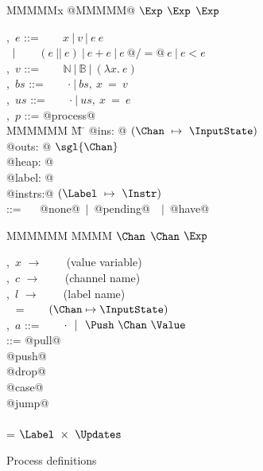 
\begin{figure}
\begin{minipage}[t]{0.4\textwidth}
\begin{tabbing}
MMMMMx \TABDEF @MMMMM@  \TABSKIP $\Exp$ \TABSKIP $\Exp$ \TABSKIP $\Exp$ \kill

\Exp,~$e$       \> ::= \> ~~~ $x~|~v~|~e~e $ \\
                \> $\enskip|~$ \> ~~ $ (e~||~e) ~|~ e+e ~|~ e~@/=@~e ~|~ e < e$ \\
\Value,~$v$     \> ::= \> ~~~ $\mathbb{N}~|~\mathbb{B}~|~(\lambda{}x.~e)$ \\
\Heap,~$bs$     \> ::= \> ~~~ $\cdot~|~bs,~x~=~v$ \\
\Updates,~$us$  \> ::= \> ~~~ $\cdot~|~us,~x~=~e$
\\[0.5em]

\Proc,~$p$      \> ::=\> @process@ \\
MMMMMM \= M \= \kill
\> \> @ins:   @  $(\Chan ~\mapsto~ \InputState)$ \\
\> \> @outs:  @  $\sgl{\Chan}$ \\
\> \> @heap:  @  \Heap \\
\> \> @label: @  \Label \\
\> \> @instrs:@  $(\Label ~\mapsto~ \Instr)$ 
\\[0.5em]
\InputState \> ::= \> ~~ @none@~$|$~@pending@~\Value~$|$~@have@
\end{tabbing}

\begin{tabbing}
MMMMMM \TABDEF MMMM \TABSKIP $\Chan$ \TABSKIP $\Chan$ \TABSKIP $\Exp$ \kill

\Var,~$x$       \> $\to$ \> ~~~ (value variable) \\
\Chan,~$c$      \> $\to$ \> ~~~ (channel name) \\
\Label,~$l$     \> $\to$ \> ~~~ (label name) \\ 
\ChannelStates  \> ~ =   \> ~~~ $(\Chan \mapsto \InputState)$ \\
\Action,~$a$   \> ::=    \> ~~~ $\cdot ~~|~~ \Push~\Chan~\Value$ \\[0.5em]

\Instr
    \> ::=\> @pull@  \> \Chan  \> \Var  \> \Next \\
    \TABALT  @push@  \> \Chan  \> \Exp  \> \Next \\
    \TABALT  @drop@  \> \Chan  \>       \> \Next \\
    \TABALT  @case@  \> \Exp   \> \Next \> \Next \\
    \TABALT  @jump@  \>        \>       \> \Next \\
\\[0.5em]

\Next \> = \> $\Label~\times~\Updates$ 
\end{tabbing}
\end{minipage}
\caption{Process definitions}
\label{fig:Process:Def}
\end{figure}


